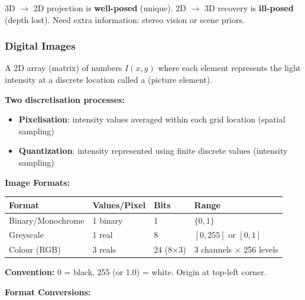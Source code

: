 \begin{tipbox}
3D $\rightarrow$ 2D projection is \textbf{well-posed} (unique). 2D $\rightarrow$ 3D recovery is \textbf{ill-posed} (depth lost). Need extra information: stereo vision or scene priors.
\end{tipbox}

\bigseparator

\subsubsection{Digital Images}

\begin{defbox}
A 2D array (matrix) of numbers $I(x,y)$ where each element represents the light intensity at a discrete location called a  (picture element).
\end{defbox}

\textbf{Two discretisation processes:}
\begin{itemize}
  \item \textbf{Pixelisation}: intensity values averaged within each grid location (spatial sampling)
  \item \textbf{Quantization}: intensity represented using finite discrete values (intensity sampling)
\end{itemize}

\separator

\textbf{Image Formats:}

\begin{center}
\renewcommand{\arraystretch}{1.3}
\begin{tabular}{@{} l l l l @{}}
\toprule
\textbf{Format} & \textbf{Values/Pixel} & \textbf{Bits} & \textbf{Range} \\
\midrule
Binary/Monochrome & 1 binary & 1 & $\{0, 1\}$ \\
Greyscale & 1 real & 8 & $[0, 255]$ or $[0, 1]$ \\
Colour (RGB) & 3 reals & 24 (8$\times$3) & 3 channels $\times$ 256 levels \\
\bottomrule
\end{tabular}
\end{center}

\textbf{Convention:} 0 = black, 255 (or 1.0) = white. Origin at top-left corner.

\separator

\textbf{Format Conversions:}

